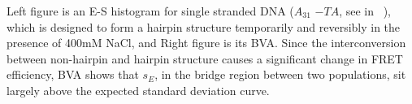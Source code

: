 Left figure is an E-S histogram for single stranded DNA ($A_31$ $-TA$, see in ~\cite{Tsukanov_2013}), which is designed to form a hairpin structure temporarily and reversibly in the presence of 400mM NaCl, and Right figure is its BVA. Since the interconversion between non-hairpin and hairpin structure causes a significant change in FRET efficiency, BVA shows that $s_E$, in the bridge region between two populations, sit largely above the expected standard deviation curve.